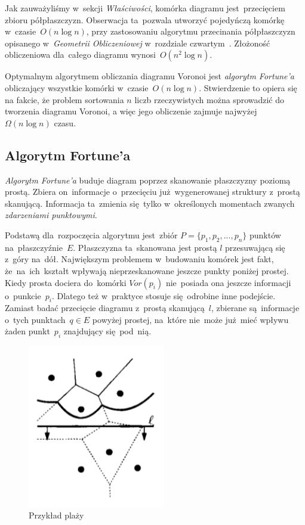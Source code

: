 \documentclass[skorowidz,autorrok,backref,xodstep,oswiadczenie]{wmimgr}
\begin{document}
Jak zauważyliśmy w~sekcji \emph{Właściwości}, komórka diagramu jest~przecięciem zbioru półpłaszczyzn. Obserwacja ta~pozwala utworzyć pojedyńczą komórkę w~czasie~$O(n \log{n})$, przy zastosowaniu algorytmu przecinania półpłaszczyzn opisanego w~\emph{Geometrii Obliczeniowej} w~rozdziale czwartym~\cite{geometria}. Złożoność obliczeniowa dla~całego diagramu wynosi~$O(n^2 \log{n})$.

Optymalnym algorytmem obliczania diagramu Voronoi jest \emph{algorytm Fortune'a} obliczający wszystkie komórki w~czasie~$O(n \log{n})$. Stwierdzenie to opiera się na fakcie, że problem sortowania $n$ liczb rzeczywistych można sprowadzić do tworzenia diagramu Voronoi, a więc jego obliczenie zajmuje najwyżej $\Omega(n \log{n})$ czasu.

\subsection{Algorytm Fortune'a}

\emph{Algorytm Fortune'a} buduje diagram poprzez skanowanie płaszczyzny poziomą prostą. Zbiera on~informacje o~przecięciu już~wygenerowanej struktury z~prostą skanującą. Informacja ta~zmienia się~tylko w~określonych momentach zwanych \emph{zdarzeniami punktowymi}.

Podstawą dla~rozpoczęcia algorytmu jest~zbiór $P = \{p_{1},p_{2},...,p_{n}\}$ punktów na~płaszczyźnie~$E$. Płaszczyzna ta~skanowana jest prostą $l$ przesuwającą się z~góry na~dół. Największym problemem w~budowaniu komórek jest fakt, że~na~ich~kształt wpływają nieprzeskanowane jeszcze punkty poniżej prostej. Kiedy prosta dociera do~komórki $Vor(p_{i})$ nie~posiada ona jeszcze informacji o~punkcie~$p_{i}$. Dlatego też w~praktyce stosuje się~odrobine inne podejście. Zamiast badać przecięcie diagramu z~prostą skanującą~$l$, zbierane są~informacje o~tych punktach~$q \in E$ powyżej prostej, na~które nie~może już~mieć wpływu żaden punkt~$p_{i}$ znajdujący się~pod~nią.

\begin{figure}[ht!]
\centering
\includegraphics[width=60mm]{images/voronoi3.png}
\caption{Przykład plaży}
\label{voronoibeach}
\end{figure}
\end{document}
